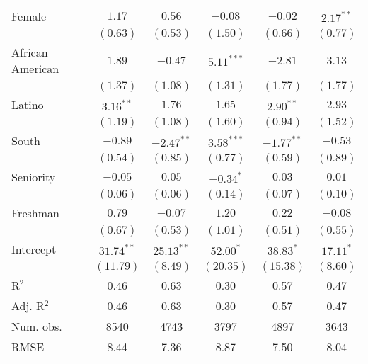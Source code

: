 \documentclass[12pt]{article}
\begin{document}
\begin{table}[H]
\begin{threeparttable}
\begin{tabular}{l c c c c c }
Female                & $1.17$       & $0.56$       & $-0.08$      & $-0.02$       & $2.17^{**}$  \\
                      & $(0.63)$     & $(0.53)$     & $(1.50)$     & $(0.66)$      & $(0.77)$     \\
African American      & $1.89$       & $-0.47$      & $5.11^{***}$ & $-2.81$       & $3.13$       \\
                      & $(1.37)$     & $(1.08)$     & $(1.31)$     & $(1.77)$      & $(1.77)$     \\
Latino                & $3.16^{**}$  & $1.76$       & $1.65$       & $2.90^{**}$   & $2.93$       \\
                      & $(1.19)$     & $(1.08)$     & $(1.60)$     & $(0.94)$      & $(1.52)$     \\
South                 & $-0.89$      & $-2.47^{**}$ & $3.58^{***}$ & $-1.77^{**}$  & $-0.53$      \\
                      & $(0.54)$     & $(0.85)$     & $(0.77)$     & $(0.59)$      & $(0.89)$     \\
Seniority             & $-0.05$      & $0.05$       & $-0.34^{*}$  & $0.03$        & $0.01$       \\
                      & $(0.06)$     & $(0.06)$     & $(0.14)$     & $(0.07)$      & $(0.10)$     \\
Freshman              & $0.79$       & $-0.07$      & $1.20$       & $0.22$        & $-0.08$      \\
                      & $(0.67)$     & $(0.53)$     & $(1.01)$     & $(0.51)$      & $(0.55)$     \\
Intercept             & $31.74^{**}$ & $25.13^{**}$ & $52.00^{*}$  & $38.83^{*}$   & $17.11^{*}$  \\
                      & $(11.79)$    & $(8.49)$     & $(20.35)$    & $(15.38)$     & $(8.60)$     \\
\hline
R$^2$                 & 0.46         & 0.63         & 0.30         & 0.57          & 0.47         \\
Adj. R$^2$            & 0.46         & 0.63         & 0.30         & 0.57          & 0.47         \\
Num. obs.             & 8540         & 4743         & 3797         & 4897          & 3643         \\
RMSE                  & 8.44         & 7.36         & 8.87         & 7.50          & 8.04         \\
\hline
\end{tabular}

\end{threeparttable}
\end{table}
\end{document}
